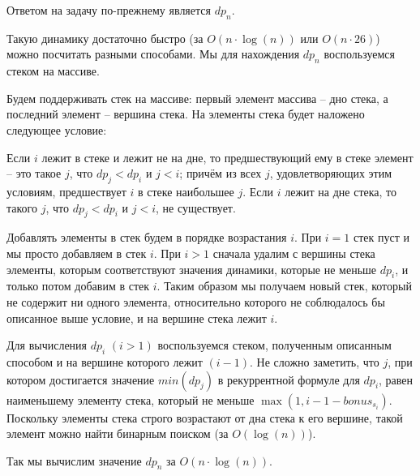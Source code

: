 Ответом на задачу по-прежнему является $dp_n$.

Такую динамику достаточно быстро (за $O(n \cdot \log(n))$ или $O(n \cdot 26)$) можно посчитать разными способами. Мы для нахождения $dp_n$ воспользуемся стеком на массиве.

Будем поддерживать стек на массиве: первый элемент массива -- дно стека, а последний элемент -- вершина стека. На элементы стека будет наложено следующее условие:

Если $i$ лежит в стеке и лежит не на дне, то предшествующий ему в стеке элемент -- это такое $j$, что $dp_j < dp_i$ и $j < i$; причём из всех $j$, удовлетворяющих этим условиям, предшествует $i$ в стеке наибольшее $j$. Если $i$ лежит на дне стека, то такого $j$, что $dp_j < dp_i$ и $j < i$, не существует.

Добавлять элементы в стек будем в порядке возрастания $i$. При $i = 1$ стек пуст и мы просто добавляем в стек $i$. При $i > 1$ сначала удалим с вершины стека элементы, которым соответствуют значения динамики, которые не меньше $dp_i$, и только потом добавим в стек $i$. Таким образом мы получаем новый стек, который не содержит ни одного элемента, относительно которого не соблюдалось бы описанное выше условие, и на вершине стека лежит $i$.

Для вычисления $dp_i$ $(i > 1)$ воспользуемся стеком, полученным описанным способом и на вершине которого лежит $(i - 1)$. Не сложно заметить, что $j$, при котором достигается значение $min(dp_j)$ в рекуррентной формуле для $dp_i$, равен наименьшему элементу стека, который не меньше $\max(1, i - 1 - bonus_{s_i})$. Поскольку элементы стека строго возрастают от дна стека к его вершине, такой элемент можно найти бинарным поиском (за $O(\log(n))$).

Так мы вычислим значение $dp_n$ за $O(n \cdot \log(n))$.

\codeExample

